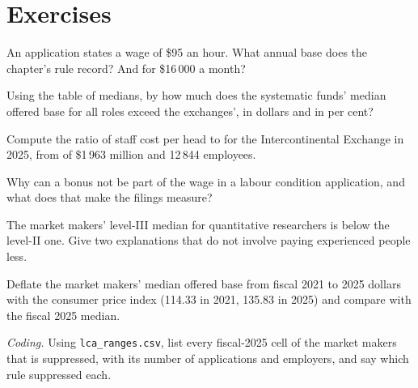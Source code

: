 \section{Exercises}

\begin{exercise}[$\star$]\label{exo:in:pay-levels-by-role-firm-type-and-seniority:1}
An application states a wage of \$95 an hour. What annual base does the chapter's rule record? And for \$16\,000 a month?
\end{exercise}

\begin{exercise}[$\star$]\label{exo:in:pay-levels-by-role-firm-type-and-seniority:2}
Using the table of medians, by how much does the systematic funds' median offered base for all roles exceed the
exchanges', in dollars and in per cent?
\end{exercise}

\begin{exercise}[$\star$]\label{exo:in:pay-levels-by-role-firm-type-and-seniority:3}
Compute the ratio of staff cost per head to  for the Intercontinental Exchange in 2025, from  of \$1\,963 million and 12\,844 employees.
\end{exercise}

\begin{exercise}[$\star\star$]\label{exo:in:pay-levels-by-role-firm-type-and-seniority:4}
Why can a bonus not be part of the wage in a labour condition application, and what does that make the filings measure?
\end{exercise}

\begin{exercise}[$\star\star$]\label{exo:in:pay-levels-by-role-firm-type-and-seniority:5}
The market makers' level-III median for quantitative researchers is below the level-II one. Give two explanations that
do not involve paying experienced people less.
\end{exercise}

\begin{exercise}[$\star\star$]\label{exo:in:pay-levels-by-role-firm-type-and-seniority:6}
Deflate the market makers' median offered base from fiscal 2021 to 2025 dollars with the consumer price index (114.33
in 2021, 135.83 in 2025) and compare with the fiscal 2025 median.
\end{exercise}

\begin{exercise}[$\star\star\star$]\label{exo:in:pay-levels-by-role-firm-type-and-seniority:7}
\emph{Coding.} Using \texttt{lca\_ranges.csv}, list every fiscal-2025 cell of the market makers that is suppressed, with
its number of applications and employers, and say which rule suppressed each.
\end{exercise}

